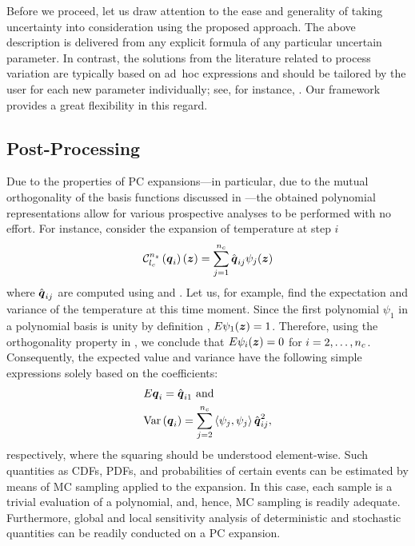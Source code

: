 Before we proceed, let us draw attention to the ease and generality of taking
uncertainty into consideration using the proposed approach. The above
description is delivered from any explicit formula of any particular uncertain
parameter. In contrast, the solutions from the literature related to process
variation are typically based on ad~hoc expressions and should be tailored by
the user for each new parameter individually; see, for instance,
\cite{ghanta2006, bhardwaj2008, huang2009a}. Our framework provides a great
flexibility in this regard.

\subsection{Post-Processing}

Due to the properties of \ac{PC} expansions---in particular, due to the mutual
orthogonality of the basis functions discussed in ---the
obtained polynomial representations allow for various prospective analyses to be
performed with no effort. For instance, consider the expansion of temperature at
step $i$
\[
  \chaos{\nz}{\lc}{\vq_i}(\vz) = \sum_{j = 1}^{\nc} \hat{\vq}_{ij} \psi_j(\vz)
\]
where $\hat{\boldsymbol{q}}_{ij}$ are computed using  and
. Let us, for example, find the expectation and
variance of the temperature at this time moment. Since the first polynomial
$\psi_1$ in a polynomial basis is unity by definition \cite{xiu2010},
$\expectation{\psi_1(\vz)} = 1$. Therefore, using the orthogonality property in
, we conclude that $\expectation{\psi_i(\vz)} =
0$ for $i = 2, \dots, {n_{c}}$. Consequently, the expected value and variance have
the following simple expressions solely based on the coefficients:
\begin{equation} \elab{chaos-chaos-moments}
  \begin{split}
    & \expectation{\vq_i} = \hat{\vq}_{i1} \text{ and} \\
    & \variance{\vq_i} = \sum_{j = 2}^{\nc} \innerproduct{\psi_j}{\psi_j} \hat{\vq}_{ij}^2,
  \end{split}
\end{equation}
respectively, where the squaring should be understood element-wise. Such
quantities as \acp{CDF}, \acp{PDF}, and probabilities of certain events can be
estimated by means of \ac{MC} sampling applied to the expansion. In this case,
each sample is a trivial evaluation of a polynomial, and, hence, \ac{MC}
sampling is readily adequate. Furthermore, global and local sensitivity analysis
of deterministic and stochastic quantities can be readily conducted on a \ac{PC}
expansion.

